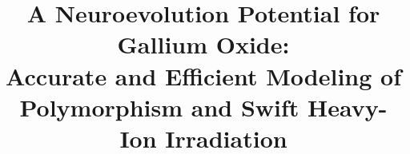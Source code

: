 \documentclass[aip,graphicx,amsmath,amssymb]{revtex4-1}
\begin{document}

\title{A Neuroevolution Potential for Gallium Oxide: \\
Accurate and Efficient Modeling of Polymorphism and Swift Heavy-Ion Irradiation}%


\end{document}
